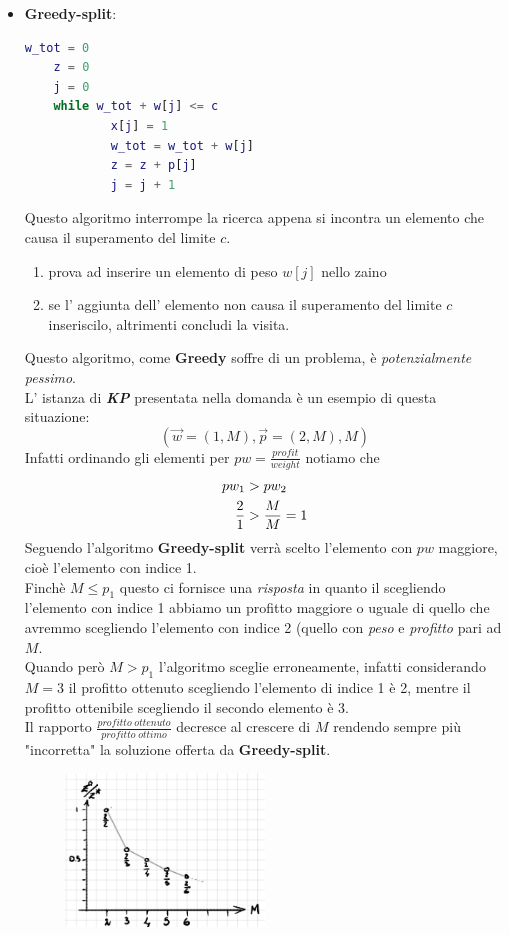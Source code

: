 \documentclass[a4paper]{article}
\newcommand{\imp}[1]{\textbf{\textit{#1}}}
\begin{document}
\begin{itemize}
\item \textbf{Greedy-split}:
		\begin{lstlisting}[language=Matlab]
	w_tot = 0
	z = 0
	j = 0
	while w_tot + w[j] <= c
			x[j] = 1
			w_tot = w_tot + w[j]
			z = z + p[j]
			j = j + 1
		\end{lstlisting}
		Questo algoritmo interrompe la ricerca appena si incontra un elemento che causa il superamento del limite $c$.
		\begin{enumerate}
			\item prova ad inserire un elemento di peso $w[j]$ nello zaino
			\item se l' aggiunta dell' elemento non causa il superamento del limite $c$ inseriscilo, altrimenti concludi la visita.
		\end{enumerate}
	Questo algoritmo, come \textbf{Greedy} soffre di un problema, è \textit{potenzialmente pessimo}.\\
	L' istanza di \imp{KP} presentata nella domanda è un esempio di questa situazione:
	$$(\vec w = (1,M), \vec p = (2,M), M)$$
	Infatti ordinando gli elementi per $pw = \frac{profit}{weight}$ notiamo che 
	\begin{align}
		pw_1  &> pw_2 \notag \\
		\frac{2}{1} &> \frac{M}{M} = 1 \notag
	\end{align}
	Seguendo l'algoritmo \textbf{Greedy-split} verrà scelto l'elemento con $pw$ maggiore, cioè l'elemento con indice 1.\\
	Finchè $M \leq p_1$ questo ci fornisce una \textit{risposta} in quanto il scegliendo l'elemento con indice 1 abbiamo un profitto maggiore o uguale di quello che avremmo scegliendo l'elemento con indice 2 (quello con \textit{peso} e \textit{profitto} pari ad $M$.\\
	Quando però $ M > p_1$ l'algoritmo sceglie erroneamente, infatti considerando $M =3$  il profitto ottenuto scegliendo l'elemento di indice 1 è 2, mentre il profitto ottenibile scegliendo il secondo elemento è 3.\\
	Il rapporto $\frac{profitto \; ottenuto}{profitto \; ottimo}$ decresce al crescere di $M$ rendendo sempre più "incorretta" la soluzione offerta da \textbf{Greedy-split}. 
\begin{figure}[!ht]
\centering
\includegraphics[width=0.5\textwidth]{./img/C_9_greedy.png}

\end{figure}
\end{itemize}
\end{document}
